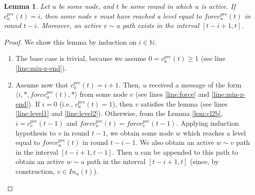 \documentclass[11pt,letterpaper]{article}
\newtheorem{lem}[thm]{Lemma}
\begin{document}
\begin{lem} \label{lem:safety-force}
	Let $u$ be some node, and $t$ be some round in which $u$ is active.
	If $c_u^{pre}(t) = i$, then some node $v$ must have reached a level equal to $force_u^{pre}(t)$ in round $t-i$.
	Moreover, an active $v \sim u$ path exists in the interval $[t-i+1,t]$.
\end{lem}
\begin{proof}
	We show this lemma by induction on $i \in \mathds{N}$.
	\begin{enumerate}
		\item The base case is trivial, because we assume $0 = c_u^{pre}(t) \geq 1$ (see line \ref{line:min-z-end}).
		\item Assume now that $c_u^{pre}(t) = i+1$.
			Then, $u$ received a message of the form $\langle i, *, force_u^{pre}(t), * \rangle$ from some node $v$ (see lines \ref{line:force} and \ref{line:min-z-end}).
			If $i = 0$ (i.e., $c_u^{pre}(t) = 1$), then $v$ satisfies the lemma (see lines \ref{line:level1} and \ref{line:level2}).
			Otherwise, from the Lemma \ref{lem:cl2b}, $i = c_v^{pre}(t-1)$ and $force_u^{pre}(t) = force_v^{pre}(t-1)$.
			Applying induction hypothesis to $v$ in round $t-1$, we obtain some node $w$ which reaches a level equal to $force_u^{pre}(t)$ in round $t-i-1$.
			We also obtain an active $w \sim v$ path in the interval $[t-i+1,t-1]$.
			Then $u$ can be appended to this path to obtain an active $w \sim u$ path in the interval $[t-i+1,t]$ (since, by construction, $v \in In_u(t)$).
	\end{enumerate}
\end{proof}
\end{document}
